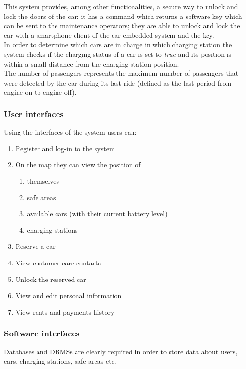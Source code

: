 	This system provides, among other functionalities, a secure way to unlock and lock the doors of the car: it has a command which returns a software key which can be sent to the maintenance operators; they are able to unlock and lock the car with a smartphone client  of the car embedded system and the key.\\
	
	In order to determine which cars are in charge in which charging station the system checks if the charging status of a car is set to \emph{true} and its position is within a small distance from the charging station position.\\
	
	The number of passengers represents the maximum number of passengers that were detected by the car during its last ride (defined as the last period from engine on to engine off).\\
		
\subsubsection{User interfaces}
	Using the interfaces of the system users can:
	\begin{enumerate}
		\item Register and log-in to the system
		\item On the map they can view the position of
			\begin{enumerate}[label=\alph*)]
				\item themselves
				\item safe areas
				\item available cars (with their current battery level)
				\item charging stations
			\end{enumerate}
		\item Reserve a car
		\item View customer care contacts 
		\item Unlock the reserved car
		\item View and edit personal information
		\item View rents and payments history
	\end{enumerate}

\subsubsection{Software interfaces}
Databases and DBMSs are clearly required in order to store data about users, cars, charging stations, safe areas etc.

